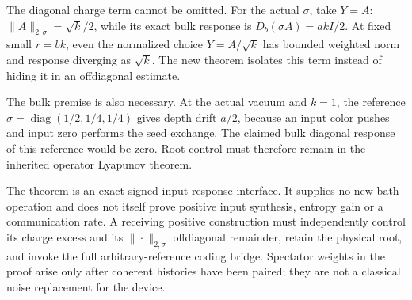 The diagonal charge term cannot be omitted. For the actual $\sigma$,
take $Y=A$: $\|A\|_{2,\sigma}=\sqrt{k}/2$, while its exact bulk response
is $D_b(\sigma A)=akI/2$. At fixed small $r=bk$, even the normalized
choice $Y=A/\sqrt{k}$ has bounded weighted norm and response diverging
as $\sqrt{k}$. The new theorem isolates this term instead of hiding it
in an offdiagonal estimate.

The bulk premise is also necessary. At the actual vacuum and $k=1$,
the reference $\sigma=\operatorname{diag}(1/2,1/4,1/4)$ gives depth
drift $a/2$, because an input color pushes and input zero performs the
seed exchange. The claimed bulk diagonal response of this reference
would be zero. Root control must therefore remain in the inherited
operator Lyapunov theorem.

The theorem is an exact signed-input response interface. It supplies no
new bath operation and does not itself prove positive input synthesis,
entropy gain or a communication rate. A receiving positive construction
must independently control its charge excess and its $\|\cdot\|_{2,\sigma}$
offdiagonal remainder, retain the physical root, and invoke the full
arbitrary-reference coding bridge. Spectator weights in the proof arise
only after coherent histories have been paired; they are not a classical
noise replacement for the device.
